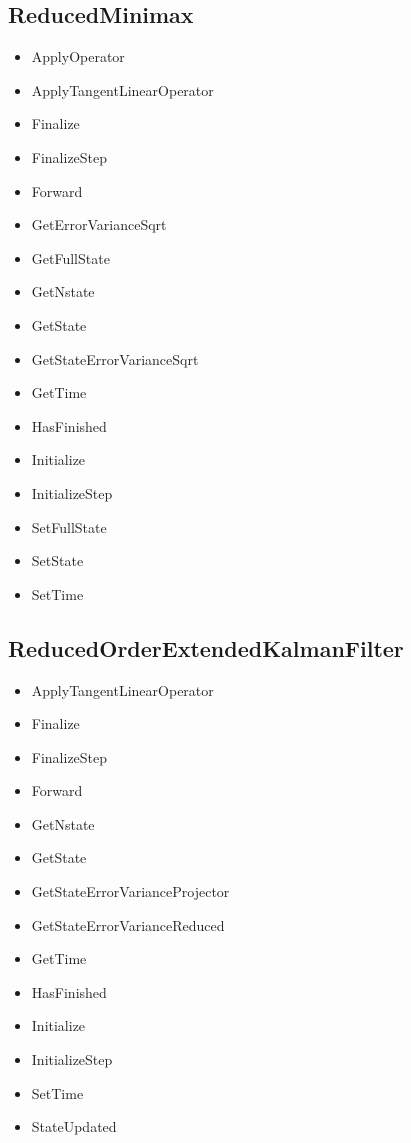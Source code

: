 \documentclass{tufte-book}
\begin{document}
\subsection{ReducedMinimax}

\begin{itemize}
\item ApplyOperator
\item ApplyTangentLinearOperator
\item Finalize
\item FinalizeStep
\item Forward
\item GetErrorVarianceSqrt
\item GetFullState
\item GetNstate
\item GetState
\item GetStateErrorVarianceSqrt
\item GetTime
\item HasFinished
\item Initialize
\item InitializeStep
\item SetFullState
\item SetState
\item SetTime
\end{itemize}

\subsection{ReducedOrderExtendedKalmanFilter}

\begin{itemize}
\item ApplyTangentLinearOperator
\item Finalize
\item FinalizeStep
\item Forward
\item GetNstate
\item GetState
\item GetStateErrorVarianceProjector
\item GetStateErrorVarianceReduced
\item GetTime
\item HasFinished
\item Initialize
\item InitializeStep
\item SetTime
\item StateUpdated
\end{itemize}
\end{document}
